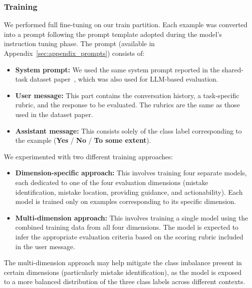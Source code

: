 \documentclass[11pt]{article}
\begin{document}
\subsubsection{Training}
\label{sec:training_qwen}

We performed full fine-tuning on our train partition.
Each example was converted into a prompt following the prompt template adopted during the model’s instruction tuning phase.
The prompt (available in Appendix~\ref{sec:appendix_prompts}) consists of:

\begin{itemize}
        \setlength\itemsep{0em}
	\item \textbf{System prompt:} We used the same system prompt reported in the shared-task dataset paper~\cite{maurya-etal-2025-unifying}, which was also used for LLM-based evaluation.
	\item \textbf{User message:} This part contains the conversation history, a task-specific rubric, and the response to be evaluated.
    The rubrics are the same as those used in the dataset paper.
	\item \textbf{Assistant message:} This consists solely of the class label corresponding to the example (\textbf{Yes} / \textbf{No} / \textbf{To some extent}).
\end{itemize}


We experimented with two different training approaches:

\begin{itemize}
    \setlength\itemsep{0em}

	\item \textbf{Dimension-specific approach:} This involves training four separate models, each dedicated to one of the four evaluation dimensions (mistake identification, mistake location, providing guidance, and actionability).
    Each model is trained only on examples corresponding to its specific dimension.
	\item \textbf{Multi-dimension approach:} This involves training a single model using the combined training data from all four dimensions.
    The model is expected to infer the appropriate evaluation criteria based on the scoring rubric included in the user message.
\end{itemize}

The multi-dimension approach may help mitigate the class imbalance present in certain dimensions (particularly mistake identification), as the model is exposed to a more balanced distribution of the three class labels across different contexts.
\end{document}
